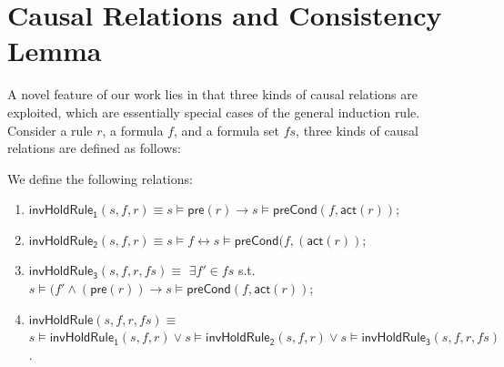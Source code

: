 \documentclass[final]{IEEEtran}
\newlength{\fminilength}
\newenvironment{fmini}[1][\linewidth]
  {\setlength{\fminilength}{#1\fboxsep-2\fboxrule}%
   \vspace{2ex}\noindent\begin{lrbox}{\fminibox}\begin{minipage}{\fminilength}%
   \mbox{ }\hfill\vspace{-2.5ex}}%
  {\end{minipage}\end{lrbox}\vspace{1ex}\hspace{0ex}%
   \framebox{\usebox{\fminibox}}}
\newenvironment{specification}
{\noindent\scriptsize
\tt\begin{fmini}\begin{tabbing}X\=X12345\=XXXX\=XXXX\=XXXX\=XXXX\=XXXX
\=\+\kill} {\end{tabbing}\normalfont\end{fmini}}
\def \andc {\wedge }
\newcommand{\forget}[1]{}
\begin{document}
\section{Causal Relations and Consistency Lemma} \label{sec:causal_rel}

A novel feature of our work lies in that three kinds of causal
relations are exploited, which are essentially special cases of the
general induction rule.  Consider a rule $r$, a formula $f$, and a formula set $fs$, three
 kinds of causal relations are defined as follows:
 \begin{definition}
We define the following relations:
\forget{$\mathsf{invHoldRule_1}::state \times formula\times rule \Rightarrow bool$, $\mathsf{invHoldRule_2}::state\times  formula\times rule  \Rightarrow bool$,  $\mathsf{invHoldRule_3}::state \times formula\times rule \times rule set\Rightarrow bool$, and $\mathsf{invHoldRule}::state \times formula\times rule \times rule set\Rightarrow bool$.}
\vspace{-0.2cm}
\begin{enumerate}
\item $\mathsf{invHoldRule_1} (s,f,r) \equiv $$s \models \mathsf{pre}(r) \longrightarrow s \models \mathsf{preCond}(f ,\mathsf{act}(r))$;
\item $\mathsf{invHoldRule_2}(s,f,r) \equiv  $$s \models f \longleftrightarrow s \models \mathsf{preCond}( f,(\mathsf{act}( r))$;
\item $\mathsf{invHoldRule_3}(s,f,r,fs) \equiv$  $\exists f' \in fs$ s.t.
$s \models ( f' \andc (\mathsf{pre}(r))  \longrightarrow s \models \mathsf{preCond}(f ,\mathsf{act}(r))$;
\item $\mathsf{invHoldRule}(s,f,r, fs) \equiv$   $s \models\mathsf{invHoldRule_1}(s,f,r) \vee s\models\mathsf{invHoldRule_2}(s,f,r) \vee s\models \mathsf{invHoldRule_3}(s,f,r,fs)$.
\end{enumerate}
\end{definition}
\vspace{-0.2cm}
\end{document}
